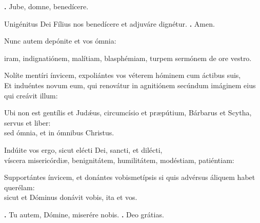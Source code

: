 \begin{small}
\textbf{\Vbar.} Jube, domne, benedícere.

Unigénitus Dei Fílius nos benedícere et adjuváre dignétur. \textbf{\Rbar.} Amen.
\end{small}


Nunc autem depónite et vos ómnia: 

iram, indignatiónem, malítiam, blasphémiam, turpem sermónem de ore vestro.

Nolíte mentíri ínvicem, expoliántes vos véterem hóminem cum áctibus suis,\\
Et induéntes novum eum, qui renovátur in agnitiónem secúndum imáginem eius qui creávit illum:


Ubi non est gentílis et Jud\'{\ae}us, circumcísio et præpútium, Bárbarus et Scytha, servus et liber: \\
sed ómnia, et in ómnibus Christus.

Indúite vos ergo, sicut elécti Dei, sancti, et dilécti, \\
víscera misericórdiæ, benignitátem, humilitátem, modéstiam, patiéntiam:

Supportántes ínvicem, et donántes vobismetípsis si quis advérsus áliquem habet querélam: \\
sicut et Dóminus donávit vobis, ita et vos.

\textbf{\Vbar.} Tu autem, Dómine, miserére nobis.
\textbf{\Rbar.} Deo grátias.

